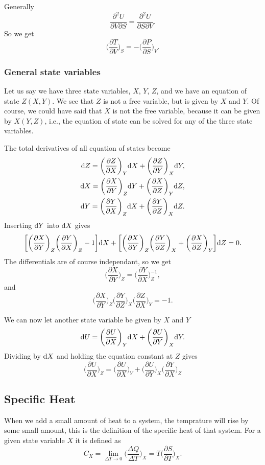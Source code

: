 \documentclass[a4paper, 11pt, notitlepage, english]{article}
\renewcommand{\d}{{\rm d}}
\renewcommand{\b}{\bigg}
\newcommand{\p}{\partial}
\begin{document}
Generally
$$\frac{\p^2 U}{\p V \p S} = \frac{\p^2 U}{\p S \p V}.$$
So we get
$$\bigg(\frac{\p T}{\p V}\bigg)_S = -\bigg(\frac{\p P}{\p S}\bigg)_V.$$

\subsubsection*{General state variables}
Let us say we have three state variables, $X$, $Y$, $Z$, and we have an equation of state $Z(X,Y)$. We see that $Z$ is not a free variable, but is given by $X$ and $Y$. Of course, we could have said that $X$ is not the free variable, because it can be given by $X(Y,Z)$, i.e., the equation of state can be solved for any of the three state variables.

The total derivatives of all equation of states become
\begin{align*}
\d Z = \bigg(\frac{\p Z}{\p X}\bigg)_Y \d X + \bigg(\frac{\p Z}{\p Y}\bigg)_X \d Y, \\
\d X = \bigg(\frac{\p X}{\p Y}\bigg)_Z \d Y + \bigg(\frac{\p X}{\p Z}\bigg)_Y \d Z, \\
\d Y = \bigg(\frac{\p Y}{\p X}\bigg)_Z \d X + \bigg(\frac{\p Y}{\p Z}\bigg)_X \d Z.
\end{align*}
Inserting $\d Y$ into $\d X$ gives
$$\bigg[\bigg(\frac{\p X}{\p Y}\bigg)_Z\bigg(\frac{\p Y}{\p X}\bigg)_Z - 1\bigg]\d X  + \bigg[\bigg(\frac{\p X}{\p Y}\bigg)_Z\bigg(\frac{\p Y}{\p Z}\bigg)_X + \bigg(\frac{\p X}{\p Z}\bigg)_Y\bigg]\d Z = 0.$$
The differentials are of course independant, so we get
$$\bigg(\frac{\p X}{\p Y}\bigg)_Z = \bigg(\frac{\p Y}{\p X}\bigg)_Z^{-1},$$
and
$$\bigg(\frac{\p X}{\p Y}\bigg)_Z \bigg(\frac{\p Y}{\p Z}\bigg)_X \bigg(\frac{\p Z}{\p X}\bigg)_Y = -1.$$

We can now let another state variable be given by $X$ and $Y$
$$\d U = \bigg(\frac{\p U}{\p X}\bigg)_Y \d X + \bigg(\frac{\p U}{\p Y}\bigg)_X \d Y.$$
Dividing by $\d X$ and holding the equation constant at $Z$ gives
$$\b( \frac{\p U}{\p X} \b)_Z = \bigg(\frac{\p U}{\p X}\b)_Y + \b(\frac{\p U}{\p Y}\b)_X \b(\frac{\p Y}{\p X}\b)_Z$$

\subsection*{Specific Heat}
When we add a small amount of heat to a system, the temprature will rise by some small amount, this is the definition of the specific heat of that system. For a given state variable $X$ it is defined as
$$C_X = \lim_{\Delta T \to 0} \b(\frac{\Delta Q}{\Delta T}\b)_X = T \b(\frac{\p S}{\p T}\b)_X.$$
\end{document}
